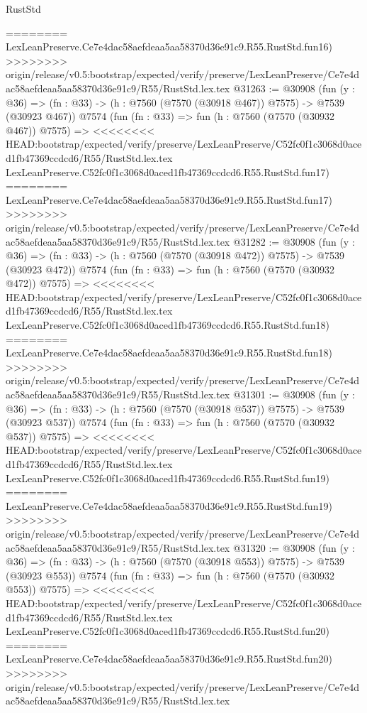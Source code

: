 \begin{lexlean}{RustStd}
\begin{coremodule}
{\begin{coremodule}
{{{{{{{{{{{{{{{{{{{{{{{{{{{{{{{{{{{{{{{{{{{========
    LexLeanPreserve.Ce7e4dac58aefdeaa5aa58370d36e91c9.R55.RustStd.fun16)
>>>>>>>> origin/release/v0.5:bootstrap/expected/verify/preserve/LexLeanPreserve/Ce7e4dac58aefdeaa5aa58370d36e91c9/R55/RustStd.lex.tex
@31263 := @30908
    (fun (y : @36) => (fn : @33) -> (h : @7560 (@7570 (@30918 @467)) @7575) -> @7539 (@30923 @467))
    @7574
    (fun (fn : @33) =>
    fun (h : @7560 (@7570 (@30932 @467)) @7575) =>
<<<<<<<< HEAD:bootstrap/expected/verify/preserve/LexLeanPreserve/C52fc0f1c3068d0aced1fb47369ccdcd6/R55/RustStd.lex.tex
    LexLeanPreserve.C52fc0f1c3068d0aced1fb47369ccdcd6.R55.RustStd.fun17)
========
    LexLeanPreserve.Ce7e4dac58aefdeaa5aa58370d36e91c9.R55.RustStd.fun17)
>>>>>>>> origin/release/v0.5:bootstrap/expected/verify/preserve/LexLeanPreserve/Ce7e4dac58aefdeaa5aa58370d36e91c9/R55/RustStd.lex.tex
@31282 := @30908
    (fun (y : @36) => (fn : @33) -> (h : @7560 (@7570 (@30918 @472)) @7575) -> @7539 (@30923 @472))
    @7574
    (fun (fn : @33) =>
    fun (h : @7560 (@7570 (@30932 @472)) @7575) =>
<<<<<<<< HEAD:bootstrap/expected/verify/preserve/LexLeanPreserve/C52fc0f1c3068d0aced1fb47369ccdcd6/R55/RustStd.lex.tex
    LexLeanPreserve.C52fc0f1c3068d0aced1fb47369ccdcd6.R55.RustStd.fun18)
========
    LexLeanPreserve.Ce7e4dac58aefdeaa5aa58370d36e91c9.R55.RustStd.fun18)
>>>>>>>> origin/release/v0.5:bootstrap/expected/verify/preserve/LexLeanPreserve/Ce7e4dac58aefdeaa5aa58370d36e91c9/R55/RustStd.lex.tex
@31301 := @30908
    (fun (y : @36) => (fn : @33) -> (h : @7560 (@7570 (@30918 @537)) @7575) -> @7539 (@30923 @537))
    @7574
    (fun (fn : @33) =>
    fun (h : @7560 (@7570 (@30932 @537)) @7575) =>
<<<<<<<< HEAD:bootstrap/expected/verify/preserve/LexLeanPreserve/C52fc0f1c3068d0aced1fb47369ccdcd6/R55/RustStd.lex.tex
    LexLeanPreserve.C52fc0f1c3068d0aced1fb47369ccdcd6.R55.RustStd.fun19)
========
    LexLeanPreserve.Ce7e4dac58aefdeaa5aa58370d36e91c9.R55.RustStd.fun19)
>>>>>>>> origin/release/v0.5:bootstrap/expected/verify/preserve/LexLeanPreserve/Ce7e4dac58aefdeaa5aa58370d36e91c9/R55/RustStd.lex.tex
@31320 := @30908
    (fun (y : @36) => (fn : @33) -> (h : @7560 (@7570 (@30918 @553)) @7575) -> @7539 (@30923 @553))
    @7574
    (fun (fn : @33) =>
    fun (h : @7560 (@7570 (@30932 @553)) @7575) =>
<<<<<<<< HEAD:bootstrap/expected/verify/preserve/LexLeanPreserve/C52fc0f1c3068d0aced1fb47369ccdcd6/R55/RustStd.lex.tex
    LexLeanPreserve.C52fc0f1c3068d0aced1fb47369ccdcd6.R55.RustStd.fun20)
========
    LexLeanPreserve.Ce7e4dac58aefdeaa5aa58370d36e91c9.R55.RustStd.fun20)
>>>>>>>> origin/release/v0.5:bootstrap/expected/verify/preserve/LexLeanPreserve/Ce7e4dac58aefdeaa5aa58370d36e91c9/R55/RustStd.lex.tex
}}}}}}}}}}}}}}}}}}}}}}}}}}}}}}}}}}}}}}}}}}}
\end{coremodule}}
\end{coremodule}
\end{lexlean}
